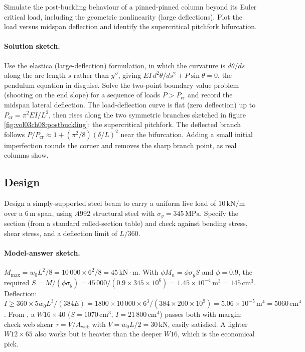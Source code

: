\begin{exercise}
Simulate the post-buckling behaviour of a pinned-pinned column
beyond its Euler critical load, including the geometric
nonlinearity (large deflections). Plot the load versus midspan
deflection and identify the supercritical pitchfork bifurcation.

\paragraph{Solution sketch.} Use the elastica (large-deflection)
formulation, in which the curvature is $d\theta/ds$ along the arc
length $s$ rather than $y''$, giving $EI\,d^2\theta/ds^2 + P\sin\theta
= 0$, the pendulum equation in disguise. Solve the two-point boundary
value problem (shooting on the end slope) for a sequence of loads
$P > P_{\text{cr}}$ and record the midspan lateral deflection. The
load-deflection curve is flat (zero deflection) up to $P_{\text{cr}} =
\pi^2EI/L^2$, then rises along the two symmetric branches sketched in
figure \ref{fig:vol03ch08:postbuckling}: the supercritical pitchfork.
The deflected branch follows $P/P_{\text{cr}} \approx 1 + (\pi^2/8)
(\delta/L)^2$ near the bifurcation. Adding a small initial
imperfection rounds the corner and removes the sharp branch point, as
real columns show.
\end{exercise}

\subsection*{Design}

\begin{exercise}
Design a simply-supported steel beam to carry a uniform live load
of $10\,\text{kN}/\text{m}$ over a $6\,\si{\meter}$ span, using
$A992$ structural steel with $\sigma_y = 345\,\text{MPa}$. Specify
the section (from a standard rolled-section table) and check
against bending stress, shear stress, and a deflection limit of
$L/360$.

\paragraph{Model-answer sketch.} $M_{\max} = w_0L^2/8 = 10\,000\times
6^2/8 = 45\,\text{kN}\cdot\text{m}$. With $\phi M_n = \phi\sigma_y S$
and $\phi = 0.9$, the required $S = M/(\phi\sigma_y) = 45\,000/(0.9
\times 345\times 10^6) = 1.45\times 10^{-4}\,\si{\meter\cubed} =
145\,\text{cm}^3$. Deflection: $I \geq 360\times 5 w_0 L^3/(384E) =
1800\times 10\,000\times 6^3/(384\times 200\times 10^9) = 5.06\times
10^{-5}\,\si{\meter\tothe{4}} = 5060\,\text{cm}^4$. From
, a $W16\times 40$ ($S = 1070\,\text{cm}^3$,
$I = 21\,800\,\text{cm}^4$) passes both with margin; check web shear
$\tau = V/A_{\text{web}}$ with $V = w_0L/2 = 30\,\text{kN}$, easily
satisfied. A lighter $W12\times 65$ also works but is heavier than the
deeper $W16$, which is the economical pick.
\end{exercise}

